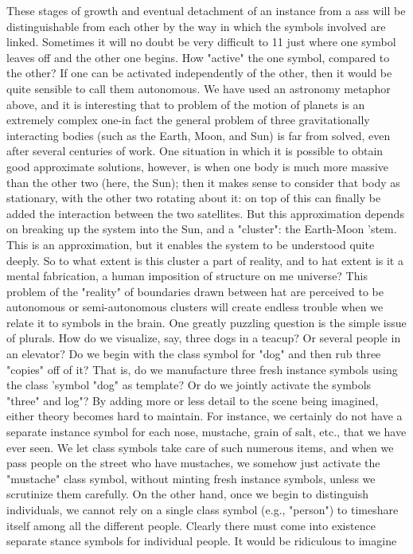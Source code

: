 These stages of growth and eventual detachment of an instance from a ass will be
distinguishable from each other by the way in which the symbols involved are linked.
Sometimes it will no doubt be very difficult to 11 just where one symbol leaves off and
the other one begins. How "active" the one symbol, compared to the other? If one can be
activated independently of the other, then it would be quite sensible to call them
autonomous.
  We have used an astronomy metaphor above, and it is interesting that to problem of the
motion of planets is an extremely complex one-in fact the general problem of three
gravitationally interacting bodies (such as the Earth, Moon, and Sun) is far from solved,
even after several centuries of work. One situation in which it is possible to obtain good
approximate solutions, however, is when one body is much more massive than the other
two (here, the Sun); then it makes sense to consider that body as stationary, with the other
two rotating about it: on top of this can finally be added the interaction between the two
satellites. But this approximation depends on breaking up the system into the Sun, and a
"cluster": the Earth-Moon 'stem. This is an approximation, but it enables the system to be
understood quite deeply. So to what extent is this cluster a part of reality, and to hat
extent is it a mental fabrication, a human imposition of structure on me universe? This
problem of the "reality" of boundaries drawn between hat are perceived to be autonomous
or semi-autonomous clusters will create endless trouble when we relate it to symbols in
the brain.
  One greatly puzzling question is the simple issue of plurals. How do we visualize, say,
three dogs in a teacup? Or several people in an elevator? Do we begin with the class
symbol for "dog" and then rub three "copies" off of it? That is, do we manufacture three
fresh instance symbols using the class 'symbol "dog" as template? Or do we jointly
activate the symbols "three" and log"? By adding more or less detail to the scene being
imagined, either theory becomes hard to maintain. For instance, we certainly do not have
a separate instance symbol for each nose, mustache, grain of salt, etc., that we have ever
seen. We let class symbols take care of such numerous items, and when we pass people
on the street who have mustaches, we somehow just activate the "mustache" class
symbol, without minting fresh instance symbols, unless we scrutinize them carefully.
  On the other hand, once we begin to distinguish individuals, we cannot rely on a single
class symbol (e.g., "person") to timeshare itself among all the different people. Clearly
there must come into existence separate stance symbols for individual people. It would be
ridiculous to imagine




